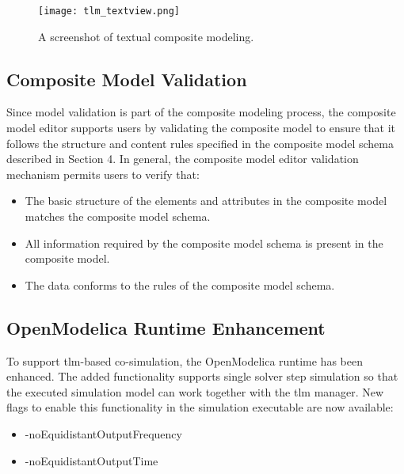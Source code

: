 \begin{landscape}
\begin{figure}
	\texttt{[image: tlm\_textview.png]}
	\caption{A screenshot of textual composite modeling.}
	\label{fig:tlmtextview}
\end{figure}
\end{landscape}

\subsection{Composite Model Validation}
\label{sec:tlmvalidation}

Since model validation is part of the composite modeling process, the composite model editor supports users by validating the composite model to ensure that it follows the structure and content rules specified in the composite model schema described in Section 4. In general, the composite model
editor validation mechanism permits users to verify that: 

\begin{itemize}

\item The basic structure of the elements and attributes in the composite model matches the composite model schema.
\item All information required by the composite model schema is present in the composite model.
\item The data conforms to the rules of the composite model schema.

\end{itemize}

\subsection{OpenModelica Runtime Enhancement}
\label{sec:tlmruntime}

To support \acrshort{tlm}-based co-simulation, the OpenModelica runtime has been enhanced. The added
functionality supports single solver step simulation so that the executed simulation model can work together
with the \acrshort{tlm} manager. New flags to enable this functionality in the simulation executable are now available:

\begin{itemize}
	
	\item -noEquidistantOutputFrequency
	\item -noEquidistantOutputTime
	
\end{itemize}

